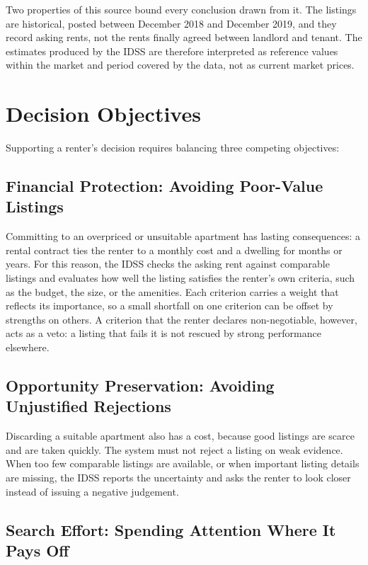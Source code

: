 \documentclass[12pt,a4paper]{report}
\begin{document}
Two properties of this source bound every conclusion drawn from it. The
listings are historical, posted between December 2018 and December 2019,
and they record asking rents, not the rents finally agreed between
landlord and tenant. The estimates produced by the IDSS are therefore interpreted as
reference values within the market and period covered by the data, not as
current market prices.

\section{Decision Objectives}
\label{sec:objectives}

Supporting a renter's decision requires balancing three competing objectives:

\subsection*{Financial Protection: Avoiding Poor-Value Listings}

Committing to an overpriced or unsuitable apartment has lasting
consequences: a rental contract ties the renter to a monthly cost and a
dwelling for months or years. For this reason, the IDSS checks the asking
rent against comparable listings and evaluates how well the listing
satisfies the renter's own criteria, such as the budget, the size, or the
amenities. Each criterion carries a weight that reflects its importance, so
a small shortfall on one criterion can be offset by strengths on others.
A criterion that the renter declares non-negotiable, however, acts as a
veto: a listing that fails it is not rescued by strong performance
elsewhere.

\subsection*{Opportunity Preservation: Avoiding Unjustified Rejections}

Discarding a suitable apartment also has a cost, because good listings are
scarce and are taken quickly. The system must not reject a listing on weak
evidence. When too few comparable listings are available, or when important
listing details are missing, the IDSS reports the uncertainty and asks the
renter to look closer instead of issuing a negative judgement.

\subsection*{Search Effort: Spending Attention Where It Pays Off}
\end{document}
